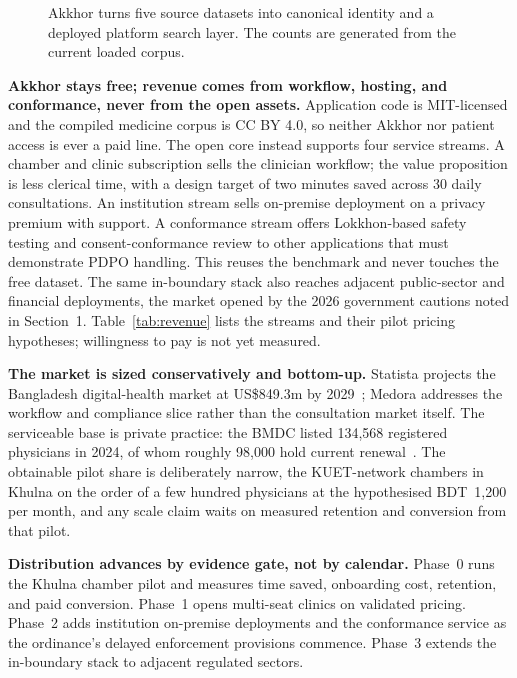 \documentclass[12pt,twocolumn,a4paper]{article}
\begin{document}
\begin{figure}[!t]
\centering
\resizebox{.72\textwidth}{!}{}
\caption{Akkhor turns five source datasets into canonical identity and a deployed platform
search layer. The counts are generated from the current loaded corpus.}
\label{fig:akkhor}
\end{figure}

\textbf{Akkhor stays free; revenue comes from workflow, hosting, and conformance, never from
the open assets.} Application code is MIT-licensed and the compiled medicine corpus is CC BY
4.0, so neither Akkhor nor patient access is ever a paid line. The open core instead supports
four service streams. A chamber and clinic subscription sells the clinician workflow; the
value proposition is less clerical time, with a design target of two minutes saved across 30
daily consultations. An institution stream sells on-premise deployment on a privacy premium
with support. A conformance stream offers Lokkhon-based safety testing and consent-conformance
review to other applications that must demonstrate PDPO handling. This reuses the benchmark and
never touches the free dataset. The same in-boundary stack also reaches adjacent
public-sector and financial deployments, the market opened by the 2026 government cautions
noted in Section~1. Table~\ref{tab:revenue} lists the streams
and their pilot pricing hypotheses; willingness to pay is not yet measured.

\textbf{The market is sized conservatively and bottom-up.} Statista projects the Bangladesh
digital-health market at US\$849.3m by 2029~\cite{statistadh}; Medora addresses the workflow
and compliance slice rather than the consultation market itself. The serviceable base is
private practice: the BMDC listed 134,568 registered physicians in 2024, of whom roughly
98,000 hold current renewal~\cite{bmdc}. The obtainable pilot share is deliberately narrow,
the KUET-network chambers in Khulna on the order of a few hundred physicians at the
hypothesised BDT~1,200 per month, and any scale claim waits on measured retention and
conversion from that pilot.

\textbf{Distribution advances by evidence gate, not by calendar.} Phase~0 runs the Khulna
chamber pilot and measures time saved, onboarding cost, retention, and paid conversion.
Phase~1 opens multi-seat clinics on validated pricing. Phase~2 adds institution on-premise
deployments and the conformance service as the ordinance's delayed enforcement provisions
commence. Phase~3 extends the in-boundary stack to adjacent regulated sectors.
\end{document}
